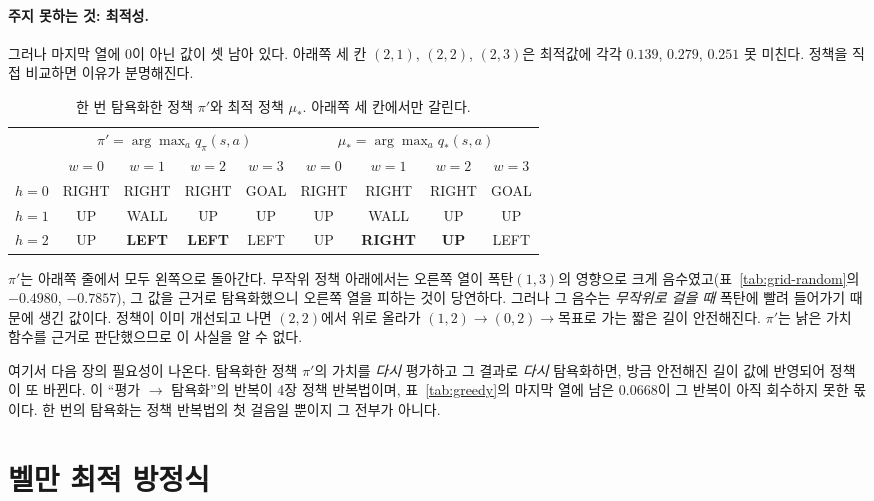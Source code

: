 \documentclass[11pt,a4paper]{article}
\begin{document}
\paragraph{주지 못하는 것: 최적성.}
그러나 마지막 열에 $0$이 아닌 값이 셋 남아 있다. 아래쪽 세 칸 $(2,1)$, $(2,2)$, $(2,3)$은 최적값에
각각 $0.139$, $0.279$, $0.251$ 못 미친다. 정책을 직접 비교하면 이유가 분명해진다.

\begin{table}[htbp]
\centering
\caption{한 번 탐욕화한 정책 $\pi'$와 최적 정책 $\mu_*$. 아래쪽 세 칸에서만 갈린다.}
\label{tab:policy-map}
\small
\begin{tabular}{@{}l|cccc|cccc@{}}
\toprule
 & \multicolumn{4}{c|}{$\pi' = \arg\max_a q_\pi(s,a)$} & \multicolumn{4}{c}{$\mu_* = \arg\max_a q_*(s,a)$} \\
 & $w=0$ & $w=1$ & $w=2$ & $w=3$ & $w=0$ & $w=1$ & $w=2$ & $w=3$ \\
\midrule
$h=0$ & RIGHT & RIGHT & RIGHT & GOAL & RIGHT & RIGHT & RIGHT & GOAL \\
$h=1$ & UP    & WALL  & UP    & UP   & UP    & WALL  & UP    & UP   \\
$h=2$ & UP    & \textbf{LEFT} & \textbf{LEFT} & LEFT & UP & \textbf{RIGHT} & \textbf{UP} & LEFT \\
\bottomrule
\end{tabular}
\end{table}

$\pi'$는 아래쪽 줄에서 모두 왼쪽으로 돌아간다. 무작위 정책 아래에서는 오른쪽 열이 폭탄$(1,3)$의
영향으로 크게 음수였고(표~\ref{tab:grid-random}의 $-0.4980$, $-0.7857$), 그 값을 근거로 탐욕화했으니
오른쪽 열을 피하는 것이 당연하다. 그러나 그 음수는 \emph{무작위로 걸을 때} 폭탄에 빨려 들어가기 때문에
생긴 값이다. 정책이 이미 개선되고 나면 $(2,2)$에서 위로 올라가 $(1,2)\to(0,2)\to$목표로 가는 짧은 길이
안전해진다. $\pi'$는 낡은 가치 함수를 근거로 판단했으므로 이 사실을 알 수 없다.

여기서 다음 장의 필요성이 나온다. 탐욕화한 정책 $\pi'$의 가치를 \emph{다시} 평가하고 그 결과로 \emph{다시}
탐욕화하면, 방금 안전해진 길이 값에 반영되어 정책이 또 바뀐다. 이 ``평가 $\to$ 탐욕화''의 반복이 4장
정책 반복법이며, 표~\ref{tab:greedy}의 마지막 열에 남은 $0.0668$이 그 반복이 아직 회수하지 못한 몫이다.
한 번의 탐욕화는 정책 반복법의 첫 걸음일 뿐이지 그 전부가 아니다.

\section{벨만 최적 방정식}
\label{sec:opt}
\end{document}
